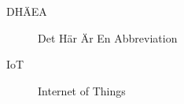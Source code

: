 \begin{description}
	\item [DH\"AEA] Det H\"ar \"Ar En Abbreviation
	\item [IoT] Internet of Things
\end{description}
